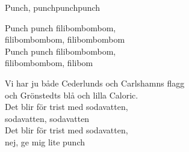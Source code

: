 \begin{song}{Punch, punch}{punchpunch}
\begin{vers}
Punch punch filibombombom,\\
filibombombom, filibombombom\\
Punch punch filibombombom,\\
filibombombom, filibom\\
\end{vers}
\begin{vers}
Vi har ju både Cederlunds och Carlshamns flagg\\
och Grönstedts blå och lilla Caloric.\\
Det blir för trist med sodavatten,\\
sodavatten, sodavatten\\
Det blir för trist med sodavatten,\\
nej, ge mig lite punch\\
\end{vers}
\end{song}
